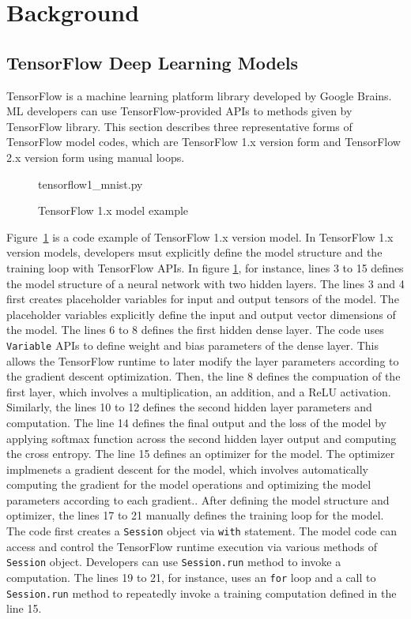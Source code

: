 \section{Background}\label{sec:background}
\subsection{TensorFlow Deep Learning Models}

TensorFlow\cite{tensorflow} is a machine learning platform library
developed by Google Brains.
ML developers can use TensorFlow-provided APIs to 
methods given by TensorFlow library.
This section describes three representative forms of TensorFlow
model codes, which are TensorFlow 1.x version form 
and TensorFlow 2.x version form using manual loops.

\begin{figure}[ht!]

{tensorflow1_mnist.py}
  \caption{TensorFlow 1.x model example}
\label{fig:back:tf1}
\end{figure}

Figure~\ref{fig:back:tf1} is a code example of TensorFlow 1.x version model.
In TensorFlow 1.x version models, developers msut explicitly define
the model structure and the training loop with TensorFlow APIs.
In figure \ref{fig:back:tf1}, for instance, lines 3 to 15 defines the model
structure of a neural network with two hidden layers.
The lines 3 and 4 first creates placeholder variables for input and output
tensors of the model. The placeholder variables explicitly define the
input and output vector dimensions of the model.
The lines 6 to 8 defines the first hidden dense layer.
The code uses {\tt Variable} APIs to define weight and bias parameters of
the dense layer. This allows the TensorFlow runtime to later modify the
layer parameters according to the gradient descent optimization.
Then, the line 8 defines the compuation of the first layer,
which involves a multiplication, an addition, and a ReLU activation.
Similarly, the lines 10 to 12 defines the second hidden layer parameters
and computation.
The line 14 defines the final output and the loss of the model by
applying softmax function across the second hidden layer output and
computing the cross entropy. 
The line 15 defines an optimizer for the model.
The optimizer implmenets a gradient descent for the model,
which involves automatically computing the gradient for the model operations
and optimizing the model parameters according to each gradient..
After defining the model structure and optimizer, the lines 17 to 21
manually defines the training loop for the model.
The code first creates a {\tt Session} object via {\tt with} statement.
The model code can access and control the TensorFlow runtime execution
via various methods of {\tt Session} object.
Developers can use {\tt Session.run} method to invoke a computation.
The lines 19 to 21, for instance, uses an {\tt for} loop and
a call to {\tt Session.run} method to repeatedly invoke a
training computation defined in the line 15.

